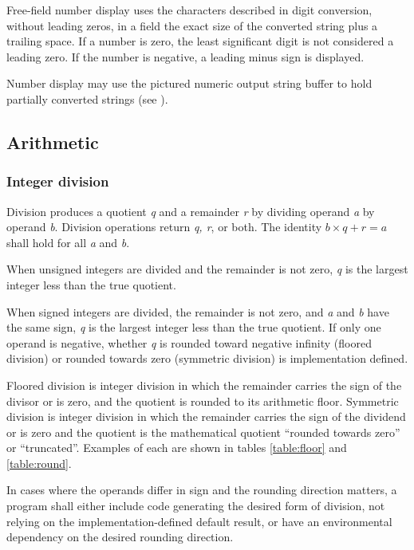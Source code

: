 Free-field number display uses the characters described in digit
conversion, without leading zeros, in a field the exact size of
the converted string plus a trailing space. If a number is zero,
the least significant digit is not considered a leading zero. If
the number is negative, a leading minus sign is displayed.

Number display may use the pictured numeric output string buffer
to hold partially converted strings (see ).

\subsection{Arithmetic} %

\subsubsection{Integer division} %
\label{usage:div}

Division produces a quotient \emph{q} and a remainder \emph{r}
by dividing operand \emph{a} by operand \emph{b}. Division
operations return \emph{q, r}, or both. The identity
$b \times q + r = a$ shall hold for all \emph{a} and \emph{b}.

When unsigned integers are divided and the remainder is not zero,
\emph{q} is the largest integer less than the true quotient.

When signed integers are divided, the remainder is not zero, and
\emph{a} and \emph{b} have the same sign, \emph{q} is the largest
integer less than the true quotient. If only one operand is
negative, whether \emph{q} is rounded toward negative infinity
(floored division) or rounded towards zero (symmetric division) is
implementation defined.

Floored division is integer division in which the remainder carries
the sign of the divisor or is zero, and the quotient is rounded to
its arithmetic floor. Symmetric division is integer division in
which the remainder carries the sign of the dividend or is zero and
the quotient is the mathematical quotient ``rounded towards zero''
or ``truncated''. Examples of each are shown in tables
\ref{table:floor} and \ref{table:round}.

In cases where the operands differ in sign and the rounding
direction matters, a program shall either include code generating
the desired form of division, not relying on the
implementation-defined default result, or have an environmental
dependency on the desired rounding direction.

